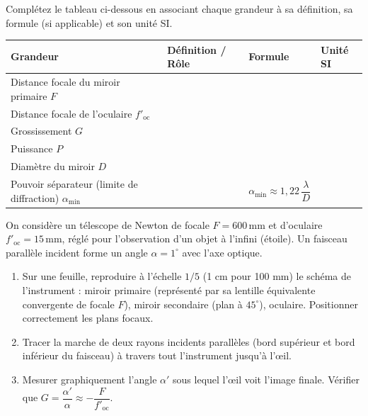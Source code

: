 \documentclass[11pt]{article}
\newcounter{popsec}
\newcounter{popsub}
\newcommand{\courssub}[1]{%
  \stepcounter{popsub}%
  \par\vspace{9pt}\noindent{\popxbold\fontsize{11.5}{13}\selectfont\color{popink}{\color{poporange}\thepopsec.\thepopsub}\hspace{6pt}#1}\par\nopagebreak\vspace{4pt}
}
\begin{document}
\begin{exercice}
Complétez le tableau ci-dessous en associant chaque grandeur à sa définition, sa formule (si applicable) et son unité SI.
\begin{center}
\begin{tabularx}{\linewidth}{|l|X|X|X|}\hline
\rowcolor{popblueL}
\textbf{Grandeur} & \textbf{Définition / Rôle} & \textbf{Formule} & \textbf{Unité SI} \\ \hline
Distance focale du miroir primaire $F$ & & & \\ \hline
Distance focale de l'oculaire $f'_{\text{oc}}$ & & & \\ \hline
Grossissement $G$ & & & \\ \hline
Puissance $P$ & & & \\ \hline
Diamètre du miroir $D$ & & & \\ \hline
Pouvoir séparateur (limite de diffraction) $\alpha_{\min}$ & & $\alpha_{\min} \approx 1,22\,\dfrac{\lambda}{D}$ & \\ \hline
\end{tabularx}
\end{center}
\end{exercice}

\courssub{Je m'entraîne}

\begin{exercice}
On considère un télescope de Newton de focale $F = 600\,\text{mm}$ et d'oculaire $f'_{\text{oc}} = 15\,\text{mm}$, réglé pour l'observation d'un objet à l'infini (étoile). Un faisceau parallèle incident forme un angle $\alpha = 1^\circ$ avec l'axe optique.
\begin{enumerate}
    \item Sur une feuille, reproduire à l'échelle $1/5$ (1 cm pour 100 mm) le schéma de l'instrument : miroir primaire (représenté par sa lentille équivalente convergente de focale $F$), miroir secondaire (plan à $45^\circ$), oculaire. Positionner correctement les plans focaux.
    \item Tracer la marche de deux rayons incidents parallèles (bord supérieur et bord inférieur du faisceau) à travers tout l'instrument jusqu'à l'œil.
    \item Mesurer graphiquement l'angle $\alpha'$ sous lequel l'œil voit l'image finale. Vérifier que $G = \dfrac{\alpha'}{\alpha} \approx -\dfrac{F}{f'_{\text{oc}}}$.
\end{enumerate}
\end{exercice}
\end{document}
